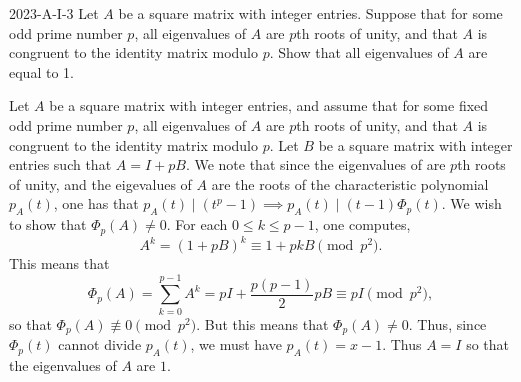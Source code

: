\documentclass{article}
\begin{document}
	\begin{prb}{2023-A-I-3}
		Let $A$ be a square matrix with integer entries. Suppose that for some odd prime number $p$, all eigenvalues of $A$ are $p$th roots of unity, and that $A$ is congruent to the identity matrix modulo $p$. Show that all eigenvalues of $A$ are equal to 1. 
	\end{prb}
	Let $A$ be a square matrix with integer entries, and assume that for some fixed odd prime number $p$, all eigenvalues of $A$ are $p$th roots of unity, and that $A$ is congruent to the identity matrix modulo $p$. Let $B$ be a square matrix with integer entries such that $A = I + pB$. We note that since the eigenvalues of are $p$th roots of unity, and the eigevalues of $A$ are the roots of the characteristic polynomial $p_A(t)$, one has that $p_A(t) \mid (t^p - 1) \implies p_{A}(t) \mid (t - 1)\Phi_p(t)$. We wish to show that $\Phi_{p}(A) \neq 0$. For each $0 \leq k \leq p - 1$, one computes, 
	\begin{equation*}
		A^{k} = (1 + pB)^{k} \equiv 1 + pkB\pmod{p^2}. 
	\end{equation*}
	This means that 
	\begin{equation*}
		\Phi_{p}(A) = \sum_{k = 0}^{p - 1}A^{k} = pI + \frac{p(p - 1)}{2}pB \equiv pI\pmod{p^2}, 
	\end{equation*}
	so that $\Phi_{p}(A) \not\equiv 0 \pmod{p^2}$. But this means that $\Phi_{p}(A) \neq 0$. Thus, since $\Phi_{p}(t)$ cannot divide $p_A(t)$, we must have $p_{A}(t) = x - 1$. Thus $A = I$ so that the eigenvalues of $A$ are $1$. 
	
\end{document}
